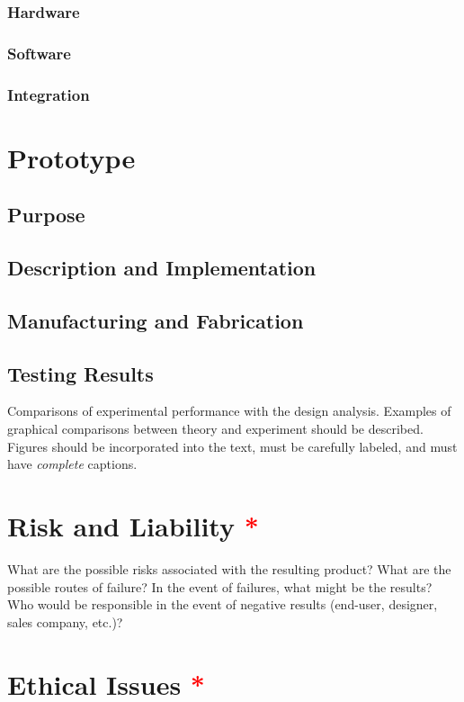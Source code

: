 \documentclass[]{aiaa-tc}%
\newcommand{\reqd}{\textcolor{red}{*}}
\begin{document}
\subsubsection{Hardware}
\subsubsection{Software}
\subsubsection{Integration}

\section{Prototype}
\subsection{Purpose}
\subsection{Description and Implementation}
\subsection{Manufacturing and Fabrication}
\subsection{Testing Results}
Comparisons of experimental performance with the design analysis.  Examples of graphical comparisons between theory and experiment should be described. Figures should be incorporated into the text, must be carefully labeled, and must have {\em complete} captions.

\section{Risk and Liability \reqd}

What are the possible risks associated with the resulting product?  What are the possible routes of failure?  In the event of failures, what might be the results?  Who would be responsible in the event of negative results (end-user, designer, sales company, etc.)?

\section{Ethical Issues \reqd}
\end{document}
